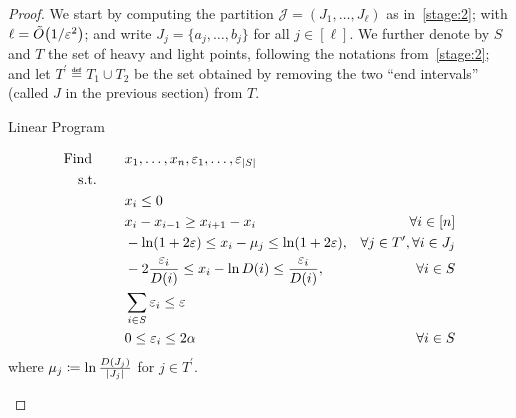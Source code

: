 \begin{proof}
We start by computing the partition $\mathcal{J}=(J_1,\dots,J_{\ell})$ as in~\cref{stage:2}; with $\ell=\tildeO{1/\eps^2}$; and write $J_j=\{a_j,\dots,b_j\}$ for all $j\in[\ell]$. We further denote by $S$ and $T$ the set of heavy and light points, following the notations from~\cref{stage:2}; and let $T^\prime \eqdef T_1\cup T_2$ be the set obtained by removing the two ``end intervals'' (called $J$ in the previous section) from $T$.

\begin{algorithm}
\caption{\label{algo:lp:logconcave}Linear Program}
\begin{align}
\text{Find }\qquad  &x_1,\dots,x_n, \eps_1,\dots,\eps_{\abs{S}} \notag\\
\text{s.t.}\qquad & \hfill& \notag\\
 &x_i \leq 0      \label{lp:01}\\
 &x_{i}-x_{i-1} \geq x_{i+1}-x_{i} & \forall i \in [n]     \label{lp:logconcave}\\
 &-\ln(1+2\eps) \leq x_i - \mu_j \leq \ln(1+2\eps), & \forall j\in T^\prime, \forall i \in J_j     \label{lp:right:weight:light:js}\\
 &-2\frac{\eps_i}{\D(i)} \leq x_i - \ln \D(i) \leq \frac{\eps_i}{\D(i)}, & \forall i\in S    \label{lp:right:weight:heavy:js}\\
 &\sum_{i\in S} \eps_i \leq \eps \label{lp:bound:sum:epsi}\\
 & 0 \leq \eps_i \leq 2\alpha & \forall i\in S \label{lp:noneg:epsi}\\
\end{align}
where $\mu_j\coloneqq \ln\frac{D(J_j)}{\left\lvert J_j \right\rvert}$ for $j\in T^\prime$.\medskip
\end{algorithm}


\end{proof}
